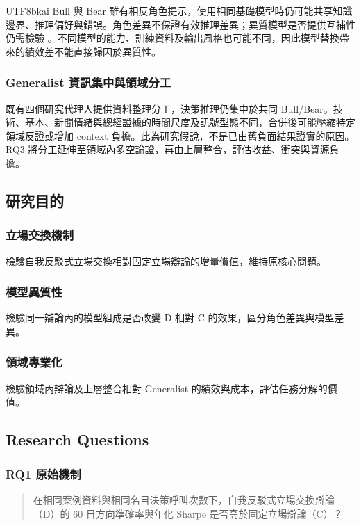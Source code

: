 \documentclass[12pt,a4paper]{article}
\begin{document}
\begin{CJK}{UTF8}{bkai}
Bull 與 Bear 雖有相反角色提示，使用相同基礎模型時仍可能共享知識邊界、推理偏好與錯誤。角色差異不保證有效推理差異；異質模型是否提供互補性仍需檢驗 \citep{zhang2025stop}。不同模型的能力、訓練資料及輸出風格也可能不同，因此模型替換帶來的績效差不能直接歸因於異質性。

\subsubsection{Generalist 資訊集中與領域分工}

既有四個研究代理人提供資料整理分工，決策推理仍集中於共同 Bull/Bear。技術、基本、新聞情緒與總經證據的時間尺度及訊號型態不同，合併後可能壓縮特定領域反證或增加 context 負擔。此為研究假說，不是已由舊負面結果證實的原因。RQ3 將分工延伸至領域內多空論證，再由上層整合，評估收益、衝突與資源負擔。

\subsection{研究目的}

\subsubsection{立場交換機制}
檢驗自我反駁式立場交換相對固定立場辯論的增量價值，維持原核心問題。

\subsubsection{模型異質性}
檢驗同一辯論內的模型組成是否改變 D 相對 C 的效果，區分角色差異與模型差異。

\subsubsection{領域專業化}
檢驗領域內辯論及上層整合相對 Generalist 的績效與成本，評估任務分解的價值。

\subsection{Research Questions}

\subsubsection{RQ1 原始機制}
\begin{quote}在相同案例資料與相同名目決策呼叫次數下，自我反駁式立場交換辯論（D）的 60 日方向準確率與年化 Sharpe 是否高於固定立場辯論（C）？\end{quote}


\end{CJK}
\end{document}
